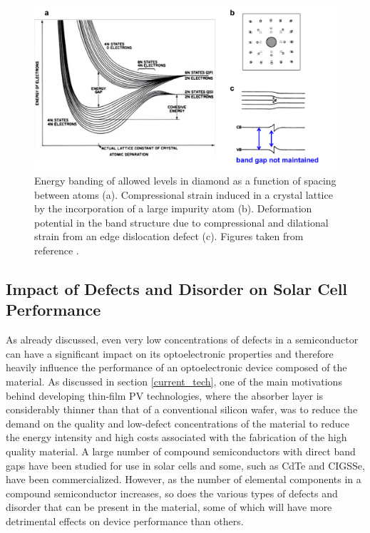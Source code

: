 \begin{figure}[h!]
  \centering
    \includegraphics[width=1.0\textwidth]{figures/pankove_band_fluc.png}
    \caption{Energy banding of allowed levels in diamond as a function of spacing between atoms (a). Compressional strain induced in a crystal lattice by the incorporation of a large impurity atom (b). Deformation potential in the band structure due to compressional and dilational strain from an edge dislocation defect (c). Figures taken from reference .}
  \label{pankove_band_fluc}
\end{figure}


\subsection{Impact of Defects and Disorder on Solar Cell Performance}\label{defects_in_PV}
As already discussed, even very low concentrations of defects in a semiconductor can have a significant impact on its optoelectronic properties and therefore heavily influence the performance of an optoelectronic device composed of the material. As discussed in section \ref{current_tech}, one of the main motivations behind developing thin-film PV technologies, where the absorber layer is considerably thinner than that of a conventional silicon wafer, was to reduce the demand on the quality and low-defect concentrations of the material to reduce the energy intensity and high costs associated with the fabrication of the high quality material. A large number of compound semiconductors with direct band gaps have been studied for use in solar cells and some, such as CdTe and CIGSSe, have been commercialized. However, as the number of elemental components in a compound semiconductor increases, so does the various types of defects and disorder that can be present in the material, some of which will have more detrimental effects on device performance than others.

